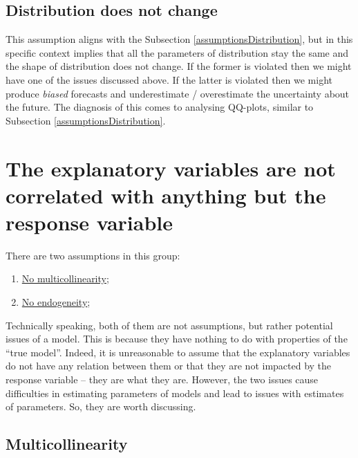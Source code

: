 \documentclass[
]{book}
\providecommand{\tightlist}{%
  \setlength{\itemsep}{0pt}\setlength{\parskip}{0pt}}
\theoremstyle{definition}
\theoremstyle{definition}
\theoremstyle{definition}
\theoremstyle{definition}
\theoremstyle{remark}
\begin{document}
\hypertarget{assumptionsDistributionFixed}{%
\subsection{Distribution does not change}\label{assumptionsDistributionFixed}}

This assumption aligns with the Subsection \ref{assumptionsDistribution}, but in this specific context implies that all the parameters of distribution stay the same and the shape of distribution does not change. If the former is violated then we might have one of the issues discussed above. If the latter is violated then we might produce \emph{biased} forecasts and underestimate / overestimate the uncertainty about the future. The diagnosis of this comes to analysing QQ-plots, similar to Subsection \ref{assumptionsDistribution}.

\hypertarget{assumptionsXreg}{%
\section{The explanatory variables are not correlated with anything but the response variable}\label{assumptionsXreg}}

There are two assumptions in this group:

\begin{enumerate}
\def\labelenumi{\arabic{enumi}.}
\tightlist
\item
  \protect\hyperlink{assumptionsXregMulti}{No multicollinearity};
\item
  \protect\hyperlink{assumptionsXregEndogeneity}{No endogeneity};
\end{enumerate}

Technically speaking, both of them are not assumptions, but rather potential issues of a model. This is because they have nothing to do with properties of the ``true model''. Indeed, it is unreasonable to assume that the explanatory variables do not have any relation between them or that they are not impacted by the response variable -- they are what they are. However, the two issues cause difficulties in estimating parameters of models and lead to issues with estimates of parameters. So, they are worth discussing.

\hypertarget{assumptionsXregMulti}{%
\subsection{Multicollinearity}\label{assumptionsXregMulti}}
\end{document}
